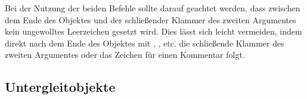 \documentclass[%
  english,ngerman,%
  cdgeometry=no,DIV=12,%
  cd=false,cdfont=false,cdtitle=true,%
  headings=normal,%
  automark,%
  listof=toc,%
]{tudscrartcl}
\begin{document}
Bei der Nutzung der beiden Befehle sollte darauf geachtet werden, dass zwischen 
dem Ende des Objektes und der schließender Klammer des zweiten Argumentes kein 
ungewolltes Leerzeichen gesetzt wird. Dies lässt sich leicht vermeiden, indem 
direkt nach dem Ende des Objektes mit , 
,  etc. die 
schließende Klammer des zweiten Argumentes oder das Zeichen für einen Kommentar 
\PValue{\%} folgt.

\begin{table}
\end{table}



\subsection{%
  Untergleitobjekte%
  \label{sec:subfloats}%
}
\end{document}
